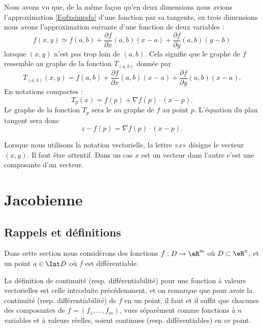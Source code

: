 Nous avons vu que, de la même façon qu'en deux dimensions nous avions l'approximation \eqref{Eqfxsimesfa} d'une fonction par sa tangente, en trois dimensions nous avons l'approximation suivante d'une fonction de deux variables :
\begin{equation}
	f(x,y)\simeq f(a,b)+\frac{ \partial f }{ \partial x }(a,b)(x-a)+\frac{ \partial f }{ \partial y }(a,b)(y-b)
\end{equation}
lorsque \( (x,y)\) n'est pas trop loin de \( (a,b)\). Cela signifie que le graphe de \( f\) ressemble au graphe de la fonction \( T_{(a,b)}\) donnée par
\begin{equation}
	T_{(a,b)}(x,y)=f(a,b)+\frac{ \partial f }{ \partial x }(a,b)(x-a)+\frac{ \partial f }{ \partial y }(a,b)(x-a).
\end{equation}
En notations compactes :
\begin{equation}
	T_p(x)=f(p)+\nabla f(p)\cdot (x-p).
\end{equation}
Le graphe de la fonction \( T_p\) sera le  au graphe de \( f\) au point \( p\). L'équation du plan tangent sera donc
\begin{equation}
	z-f(p)=\nabla f(p)\cdot (x-p).
\end{equation}

\begin{remark}
	Lorsque nous utilisons la notation vectorielle, la lettre «\( x\)» désigne le vecteur \( (x,y)\). Il faut être attentif. Dans un cas \( x\) est un vecteur dans l'autre c'est une composante d'un vecteur.
\end{remark}

\section{Jacobienne}

\subsection{Rappels et définitions}

Dans cette section nous considérons des fonctions \( f : D \to \eR^m\)
où \( D \subset \eR^n\), et un point \( a \in \Int D\) où \( f\) est
différentiable.
\begin{remark}
	La définition de continuité (resp. différentiabilité) pour une
	fonction à valeurs vectorielles est celle introduite précédemment,
	et on remarque que pour avoir la continuité
	(resp. différentiabilité) de \( f\) en un point, il faut et il suffit
	que chacunes des composantes de \( f = (f_1,\ldots, f_m)\), vues
	séparément comme fonctions à \( n\) variables et à valeurs réelles,
	soient continues (resp. différentiables) en ce point.
\end{remark}

